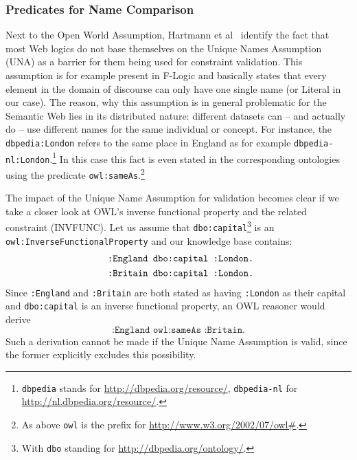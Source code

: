 \subsubsection{Predicates for Name Comparison}
Next to the Open World Assumption, 
Hartmann et al~\cite{bosch2015}
identify the fact that most Web logics do not base themselves on the Unique Names Assumption (UNA) 
as a barrier for them being used 
for constraint validation. This assumption is for example present in F-Logic \cite{flogic}  and basically states that every element in the domain of discourse
can only have one single name (\uri or Literal in our case).  The reason, why this assumption is in general problematic for the Semantic Web lies in its distributed nature: 
different datasets can -- and actually do -- use different names for the same individual or concept.
For instance, the \uri \texttt{dbpedia:London} refers to the same place in England as 
for example \texttt{dbpedia-nl:London}.\footnote{\texttt{dbpedia} stands for \url{http://dbpedia.org/resource/}, \texttt{dbpedia-nl} for \url{http://nl.dbpedia.org/resource/}.} In this case this fact is even stated in the corresponding ontologies using the 
predicate \texttt{owl:sameAs}.\footnote{As above \texttt{owl} is the prefix for \url{http://www.w3.org/2002/07/owl\#}.}

The impact of the Unique Name Assumption for \rdf validation becomes clear if we take a closer look at OWL's inverse functional property and the related constraint (INVFUNC). 
Let us assume that \texttt{dbo:capital}\footnote{With \texttt{dbo} standing for \url{http://dbpedia.org/ontology/}.} 
is an \texttt{owl:InverseFunctionalProperty} and our knowledge base contains:
\begin{align}\notag
 \texttt{:England dbo:capital :London.}\\\texttt{ :Britain dbo:capital :London.}\label{conflict}
\end{align}
Since \texttt{:England} and \texttt{:Britain} are both stated as having \texttt{:London} as their capital and \texttt{dbo:capital} is an inverse functional property,
an OWL reasoner would derive  
\begin{equation}
 \texttt{:England  owl:sameAs :Britain.}
\end{equation}
Such a derivation cannot be made if the Unique Name Assumption is valid, since the former explicitly excludes this possibility. 

